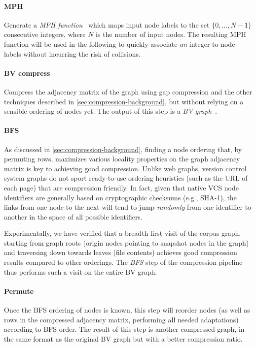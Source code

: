 \paragraph{MPH}
Generate a \emph{\gls{MPH} function}~\cite{GOVFSCF} which maps input
node labels to the set $\{0,\ldots,N-1\}$ consecutive integers, where $N$ is
the number of input nodes. The resulting \gls{MPH} function will be used in the
following to quickly associate \emph{an} integer to node labels without
incurring the risk of collisions.

\paragraph{BV compress}
Compress the adjacency matrix of the graph using gap compression and the other
techniques described in \cref{sec:compression-background}, but without
relying on a sensible ordering of nodes yet. The output of this step is a
\emph{BV graph}~\cite{boldi-vigna-webgraph-1}.

\paragraph{BFS}
As discussed in \cref{sec:compression-background}, finding a node
ordering that, by permuting rows, maximizes various locality properties on the
graph adjacency matrix is key to achieving good compression. Unlike web
graphs, version control system graphs do not sport ready-to-use ordering
heuristics (such as the URL of each page) that are compression friendly. In
fact, given that native VCS node identifiers are generally based on
cryptographic checksums (e.g., SHA-1), the links from one node to the next will
tend to jump \emph{randomly} from one identifier to another in the space of all
possible identifiers.

Experimentally, we have verified that a breadth-first visit of the corpus graph,
starting from graph roots (origin nodes pointing to snapshot nodes in the
graph) and traversing down towards leaves (file contents) achieves good
compression results compared to other orderings.  The \emph{BFS} step of the
compression pipeline thus performs such a visit on the entire BV graph.

\paragraph{Permute}
Once the BFS ordering of nodes is known, this step will reorder nodes (as well
as rows in the compressed adjacency matrix, performing all needed adaptations)
according to BFS order. The result of this step is another compressed graph, in
the same format as the original BV graph but with a better compression ratio.

